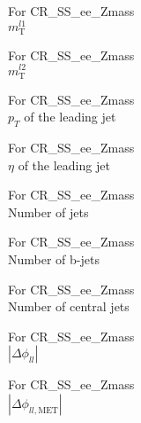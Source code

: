 \begin{frame}{For CR\_SS\_ee\_Zmass \\ $m_{\text{T}}^{l1}$}
\end{frame}

\begin{frame}{For CR\_SS\_ee\_Zmass \\ $m_{\text{T}}^{l2}$}
\end{frame}

\begin{frame}{For CR\_SS\_ee\_Zmass \\ $p_T$ of the leading jet}
\end{frame}

\begin{frame}{For CR\_SS\_ee\_Zmass \\ $\eta$ of the leading jet}
\end{frame}

\begin{frame}{For CR\_SS\_ee\_Zmass \\ Number of jets}
\end{frame}

\begin{frame}{For CR\_SS\_ee\_Zmass \\ Number of b-jets}
\end{frame}

\begin{frame}{For CR\_SS\_ee\_Zmass \\ Number of central jets}
\end{frame}

\begin{frame}{For CR\_SS\_ee\_Zmass \\ $|\Delta\phi_{ll}|$}
\end{frame}

\begin{frame}{For CR\_SS\_ee\_Zmass \\ $|\Delta\phi_{ll,\text{MET}}|$}
\end{frame}

